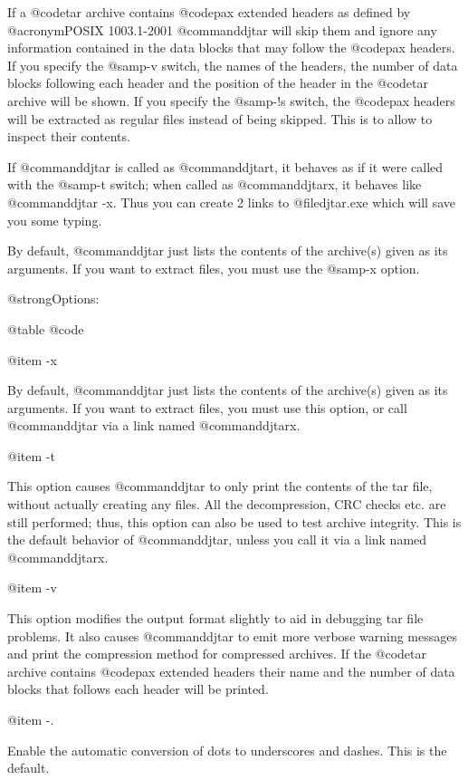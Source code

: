 If a @code{tar} archive contains @code{pax} extended headers as defined
by @acronym{POSIX} 1003.1-2001 @command{djtar} will skip them and ignore
any information contained in the data blocks that may follow the @code{pax}
headers.  If you specify the @samp{-v} switch, the names of the headers,
the number of data blocks following each header and the position of the
header in the @code{tar} archive will be shown.  If you specify the @samp{-!s}
switch, the @code{pax} headers will be extracted as regular files instead of
being skipped.  This is to allow to inspect their contents.

If @command{djtar} is called as @command{djtart}, it behaves as if it were
called with the @samp{-t} switch; when called as @command{djtarx}, it
behaves like @command{djtar -x}.  Thus you can create 2 links to
@file{djtar.exe} which will save you some typing.

By default, @command{djtar} just lists the contents of the archive(s)
given as its arguments.  If you want to extract files, you must use
the @samp{-x} option.

@strong{Options:}

@table @code

@item -x

By default, @command{djtar} just lists the contents of the archive(s)
given as its arguments.  If you want to extract files, you must use
this option, or call @command{djtar} via a link named @command{djtarx}.

@item -t

This option causes @command{djtar} to only print the contents of the tar
file, without actually creating any files.  All the decompression, CRC
checks etc. are still performed; thus, this option can also be used to
test archive integrity.  This is the default behavior of
@command{djtar}, unless you call it via a link named @command{djtarx}.

@item -v

This option modifies the output format slightly to aid in debugging tar
file problems.  It also causes @command{djtar} to emit more verbose warning
messages and print the compression method for compressed archives.  If the
@code{tar} archive contains @code{pax} extended headers their name and the
number of data blocks that follows each header will be printed.

@item -.

Enable the automatic conversion of dots to underscores and dashes.  This
is the default.

